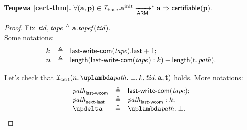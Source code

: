 \noindent
{\bf Теорема \ref{cert-thm}.}
$\forall (\mathbf{a}, \mathbf{p}) \in \mathcal{I}_{\textup{\rm base}}. \mathbf{a}^{\rm init} \xrightarrow[\mathsf{ARM}]{}^{*} \mathbf{a} \Rightarrow \mathsf{certifiable}(\mathbf{p})$.
\begin{proof}%
  Fix $\mathit{tid}, \mathit{tape} \triangleq \mathbf{a}.\mathit{tapef}(\mathit{tid})$. \\
  Some notations:
  \[\begin{array}{l l l}
    k & \triangleq & \lastInstr{\lastCommittedWrite(\tape)} + 1; \\
    n & \triangleq & \length(\lastCommittedWrite(\tape):k) - \length(\tT.\cpath). \\
  \end{array}\]

  Let's check that $\invCert(n, \lambda \cpath. \; \bot, k, \tId, \aT, \tT)$ holds.
  More notations:
  \[\begin{array}{l l l}
    \cpath_{\textup{\sf last-wcom}} & \triangleq & \lastCommittedWrite(\tape); \\
    \cpath_{\textup{\sf next-last}} & \triangleq & \cpath_{\textup{\sf last-wcom}}:k; \\
    \delta & \triangleq & \lambda \cpath. \; \bot. \\
  \end{array}\]


\end{proof}
